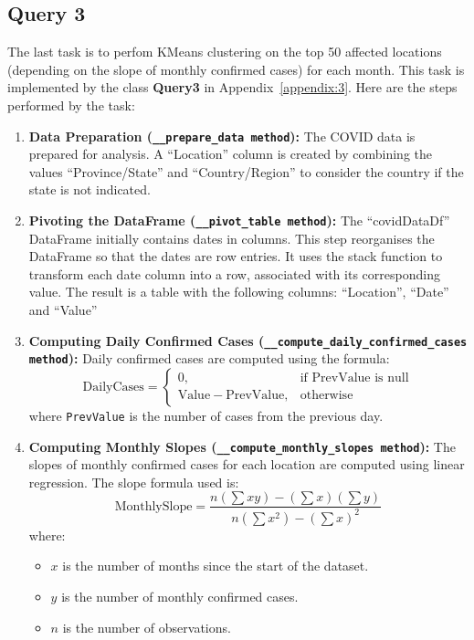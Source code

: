 \documentclass[12pt,oneside]{book} %
\begin{document}
\subsection{Query 3}
The last task is to perfom KMeans clustering on the top 50 affected locations
(depending on the slope of monthly confirmed cases) for each month. This task
is implemented by the class \textbf{Query3} in Appendix~\ref{appendix:3}. Here
are the steps performed by the task:
\begin{enumerate}
    \item \textbf{Data Preparation (\texttt{\_\_prepare\_data method}):}  The COVID data is prepared for analysis. A ``Location'' column is created by combining the values ``Province/State'' and ``Country/Region'' to consider the country if the state is not indicated.

    \item \textbf{Pivoting the DataFrame (\texttt{\_\_pivot\_table method}):} The ``covidDataDf'' DataFrame initially contains dates in columns. This step reorganises the DataFrame so that the dates are row entries. It uses the stack function to transform each date column into a row, associated with its corresponding value. The result is a table with the following columns: ``Location'', ``Date'' and ``Value''

    \item \textbf{Computing Daily Confirmed Cases (\texttt{\_\_compute\_daily\_confirmed\_cases method}):} Daily confirmed cases are computed using the formula:
          \begin{equation}
              \text{DailyCases} =
              \begin{cases}
                  \text{0},                        & \text{if } \text{PrevValue is null} \\
                  \text{Value} - \text{PrevValue}, & \text{otherwise}
              \end{cases}
          \end{equation}
          where \texttt{PrevValue} is the number of cases from the previous day.

    \item \textbf{Computing Monthly Slopes (\texttt{\_\_compute\_monthly\_slopes method}):} The slopes of monthly confirmed cases for each location are computed using linear regression. The slope formula used is:
          \begin{equation}
              \text{MonthlySlope} = \frac{n(\sum xy) - (\sum x)(\sum y)}{n(\sum x^2) - {(\sum x)}^2}
          \end{equation}
          where:
          \begin{itemize}
              \item $x$ is the number of months since the start of the dataset.
              \item $y$ is the number of monthly confirmed cases.
              \item $n$ is the number of observations.
          \end{itemize}


\end{enumerate}
\end{document}
